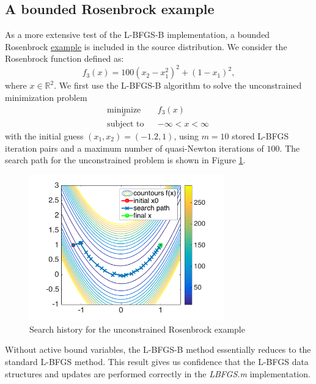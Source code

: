 \documentclass[11pt]{article}
\begin{document}
\subsection{A bounded Rosenbrock example}

As a more extensive test of the L-BFGS-B implementation,
a bounded Rosenbrock
\href{https://github.com/bgranzow/L-BFGS-B/blob/master/test_rosenbrock.m}
{example} is included in the source distribution.
We consider the Rosenbrock function defined as:
%
\begin{equation}
f_3(x) = 100(x_2-x_1^2)^2 + (1-x_1)^2,
\end{equation}
%
where $x \in \mathbb{R}^2$.
We first use the L-BFGS-B algorithm to solve the
unconstrained minimization problem
%
\begin{equation}
\begin{aligned}
& \underset{x}{\text{minimize}}
& & f_3(x) \\
& \text{subject to}
& & -\infty < x < \infty  \quad
\end{aligned}
\end{equation}
%
with the initial guess $(x_1,x_2) = (-1.2, 1)$, using
$m=10$ stored L-BFGS iteration pairs and a maximum
number of quasi-Newton iterations of $100$.
The search path for the unconstrained problem is
shown in Figure \ref{fig:rosenbrock_unconstrained}.
%
\begin{figure}[hbt!]
\centering
\includegraphics[width=0.75\textwidth]{rosenbrock_unbounded}
\caption{Search history for the unconstrained Rosenbrock example}
\label{fig:rosenbrock_unconstrained}
\end{figure}
%
Without active bound variables, the L-BFGS-B method essentially
reduces to the standard L-BFGS method. This result gives us
confidence that the L-BFGS data structures and updates
are performed correctly in the \emph{LBFGS.m} implementation.
\end{document}
